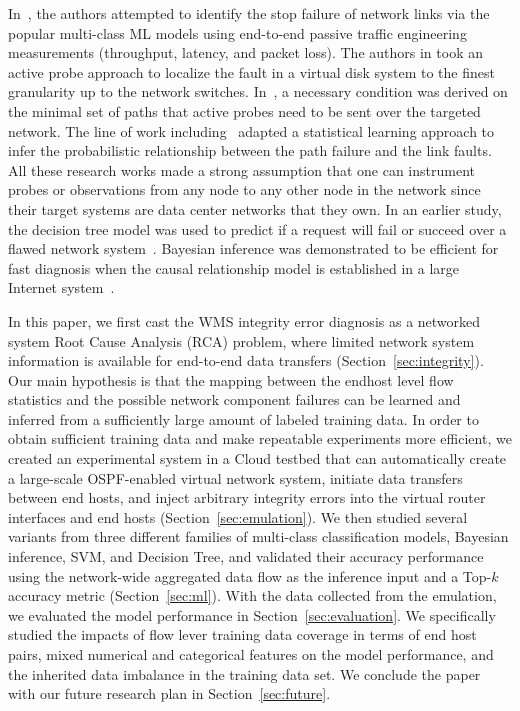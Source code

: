In~\cite{Link-JIoT-2019}, the authors attempted to identify the stop failure of network links via the popular multi-class ML models using end-to-end passive traffic engineering measurements (throughput, latency, and packet loss). The authors in \cite{DeepView:NSDI18} took an active probe approach to localize the fault in a virtual disk system to the finest granularity up to the network switches. In~\cite{netbouncer:nsdi18}, a necessary condition was derived on the minimal set of paths that active probes need to be sent over the targeted network. The line of work including~\cite{NetPoirot:Sigcomm2016,KDD14} adapted a statistical learning approach to infer the probabilistic relationship between the path failure and the link faults. All these research works made a strong assumption that one can instrument probes or observations from any node to any other node in the network since their target systems are data center networks that they own. In an earlier study, the decision tree model was used to predict if a request will fail or succeed over a flawed network system~\cite{DT:2004}. Bayesian inference was demonstrated to be efficient for fast diagnosis when the causal relationship model is established in a large Internet system~\cite{BN-Internet:2007}.

In this paper, we first cast the WMS integrity error diagnosis as a networked system Root Cause Analysis (RCA) problem, where limited network system information is available for end-to-end data transfers (Section~\ref{sec:integrity}). Our main hypothesis is that the mapping between the endhost level flow statistics and the possible network component failures can be learned and inferred from a sufficiently large amount of labeled training data. In order to obtain sufficient training data and make repeatable experiments more efficient, we created an experimental system in a Cloud testbed that can automatically create a large-scale OSPF-enabled virtual network system, initiate data transfers between end hosts, and inject arbitrary integrity errors into the virtual router interfaces and end hosts (Section~\ref{sec:emulation}). We then studied several variants from three different families of multi-class classification models, Bayesian inference, SVM, and Decision Tree, and validated their accuracy performance using the network-wide aggregated data flow as the inference input and a Top-$k$ accuracy metric (Section~\ref{sec:ml}). With the data collected from the emulation, we evaluated the model performance in Section~\ref{sec:evaluation}. We specifically studied the impacts of flow lever training data coverage in terms of end host pairs, mixed numerical and categorical features on the model performance, and the inherited data imbalance in the training data set. We conclude the paper with our future research plan in Section~\ref{sec:future}.
